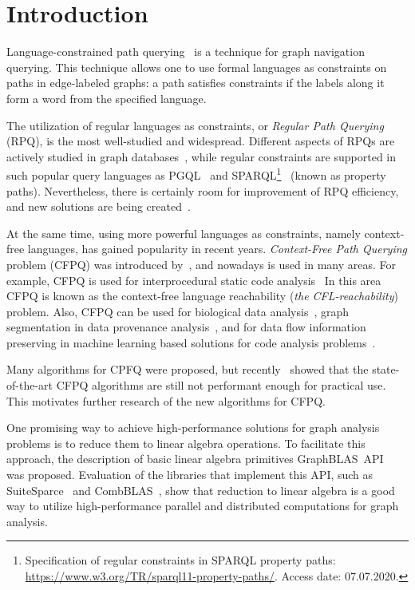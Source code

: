 \section{Introduction}


Language-constrained path querying~\citep{barrett2000formal} is a technique for graph navigation querying.
This technique allows one to use formal languages as constraints on paths in edge-labeled graphs: a path satisfies constraints if the labels along it form a word from the specified language.

The utilization of regular languages as constraints, or \textit{Regular Path Querying} (RPQ), is the most well-studied and widespread.
Different aspects of RPQs are actively studied in graph databases~\citep{10.1145/2463664.2465216, 10.1145/3104031,10.1145/2850413}, while regular constraints are supported in such popular query languages as PGQL~\citep{10.1145/2960414.2960421} and SPARQL\footnote{Specification of regular constraints in SPARQL property paths: \url{https://www.w3.org/TR/sparql11-property-paths/}. Access date: 07.07.2020.}~\citep{10.1007/978-3-319-25007-6_1} (known as property paths).
Nevertheless, there is certainly room for improvement of RPQ efficiency, and new solutions are being created~\citep{Wang2019,10.1145/2949689.2949711}.

At the same time, using more powerful languages  as constraints, namely context-free languages, has gained popularity in recent years.
\textit{Context-Free Path Querying} problem (CFPQ) was introduced by~\cite{Yannakakis}, and nowadays is used in many areas.
For example, CFPQ is used for interprocedural static code analysis~\citep{10.1145/3158118,10.5555/271338.271343, YanSCA, Zheng:2008:DAA:1328897.1328464}
In this area CFPQ is known as the context-free language reachability (\textit{the CFL-reachability}) problem.
Also, CFPQ can be used for biological data analysis~\citep{GraphQueryWithEarley}, graph segmentation in data provenance analysis~\citep{8731467}, and for data flow information preserving in machine learning based solutions for code analysis problems~\citep{10.1145/3428301}.

Many algorithms for CPFQ were proposed, but recently~\cite{Kuijpers:2019:ESC:3335783.3335791} showed that the state-of-the-art CFPQ algorithms are still not performant enough for practical use.
This motivates further research of the new algorithms for CFPQ.

One promising way to achieve high-performance solutions for graph analysis problems is to reduce them to linear algebra operations.
To facilitate this approach, the description of basic linear algebra primitives GraphBLAS~API~\citep{7761646} was proposed.
Evaluation of the libraries that implement this API, such as SuiteSparce~\citep{10.1145/3322125} and CombBLAS~\citep{10.1177/1094342011403516}, show that reduction to linear algebra is a good way to utilize high-performance parallel and distributed computations for graph analysis.

